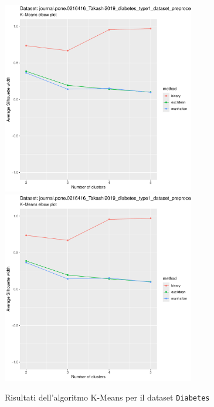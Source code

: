 \documentclass[a4paper, 12pt]{report}
\begin{document}
			\begin{figure}[H]
				\centering
				\includegraphics[width = 0.75\textwidth, height = 0.45\textheight, page = 1]{
					results/results_Diabetes.csv.pdf
				}
				\includegraphics[width = 0.75\textwidth, height = 0.45\textheight, page = 2]{
					results/results_Diabetes.csv.pdf
				}
				\caption{Risultati dell'algoritmo K-Means per il dataset
				\texttt{Diabetes}}
				\label{fig:kmeans4}
			\end{figure}
\end{document}
